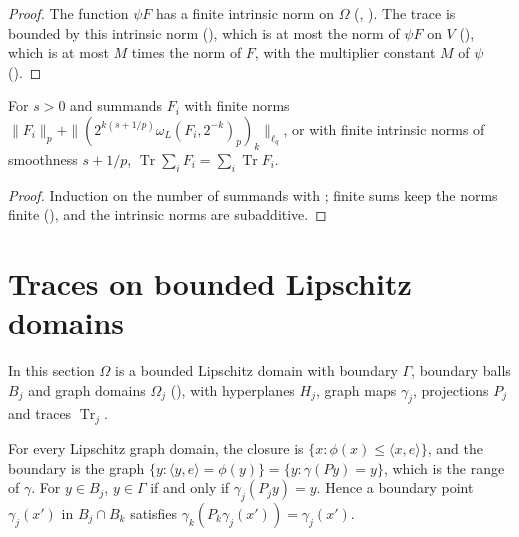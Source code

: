 \begin{proof}
\leanok
The function $\psi F$ has a finite intrinsic norm on $\Omega$ (,
). The trace is bounded by this intrinsic norm
(), which is at most the norm of $\psi F$ on $V$ (),
which is at most $M$ times the norm of $F$, with the multiplier constant $M$ of $\psi$
().
\end{proof}

\begin{lemma}
\label{lem:trace-sums}
\leanok
{}
For $s > 0$ and summands $F_i$ with finite norms
$\|F_i\|_p + \|(2^{k(s + 1/p)} \omega_L(F_i, 2^{-k})_p)_k\|_{\ell_q}$, or with finite intrinsic
norms of smoothness $s + 1/p$,
$\operatorname{Tr} \sum_i F_i = \sum_i \operatorname{Tr} F_i$.
\end{lemma}

\begin{proof}
\leanok
Induction on the number of summands with ; finite sums keep the norms finite
(), and the intrinsic norms are subadditive.
\end{proof}

\section{Traces on bounded Lipschitz domains}
\label{sec:bounded-lipschitz-traces}

In this section $\Omega$ is a bounded Lipschitz domain with boundary $\Gamma$, boundary balls
$B_j$ and graph domains $\Omega_j$ (), with hyperplanes $H_j$, graph
maps $\gamma_j$, projections $P_j$ and traces $\operatorname{Tr}_j$.

\begin{lemma}
\label{lem:boundary-charts}
\leanok
{}
For every Lipschitz graph domain, the closure is $\{x : \phi(x) \leq \langle x, e \rangle\}$, and
the boundary is the graph
$\{y : \langle y, e \rangle = \phi(y)\} = \{y : \gamma(Py) = y\}$, which is the range of $\gamma$.
For $y \in B_j$, $y \in \Gamma$ if and only if $\gamma_j(P_j y) = y$. Hence a boundary point
$\gamma_j(x')$ in $B_j \cap B_k$ satisfies $\gamma_k(P_k \gamma_j(x')) = \gamma_j(x')$.
\end{lemma}

